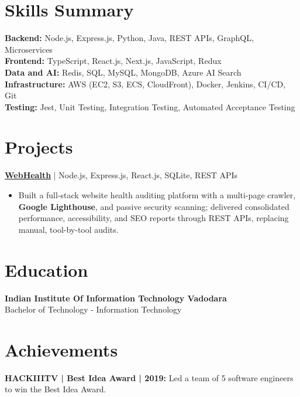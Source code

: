 \documentclass[a4paper,10pt]{article}
\begin{document}
\section{Skills Summary}
\textbf{Backend:} Node.js, Express.js, Python, Java, REST APIs, GraphQL, Microservices\\
\textbf{Frontend:} TypeScript, React.js, Next.js, JavaScript, Redux\\
\textbf{Data and AI:} Redis, SQL, MySQL, MongoDB, Azure AI Search\\
\textbf{Infrastructure:} AWS (EC2, S3, ECS, CloudFront), Docker, Jenkins, CI/CD, Git\\
\textbf{Testing:} Jest, Unit Testing, Integration Testing, Automated Acceptance Testing

\section{Projects}
\textbf{\href{https://web-health-eta.vercel.app/}{WebHealth}} | Node.js, Express.js, React.js, SQLite, REST APIs
\begin{itemize}
\item Built a full-stack website health auditing platform with a multi-page crawler, \textbf{Google Lighthouse}, and passive security scanning; delivered consolidated performance, accessibility, and SEO reports through REST APIs, replacing manual, tool-by-tool audits.
\end{itemize}

\section{Education}
\textbf{Indian Institute Of Information Technology Vadodara}\\
Bachelor of Technology - Information Technology

\section{Achievements}
\textbf{HACKIIITV | Best Idea Award | 2019:} Led a team of 5 software engineers to win the Best Idea Award.
\end{document}

